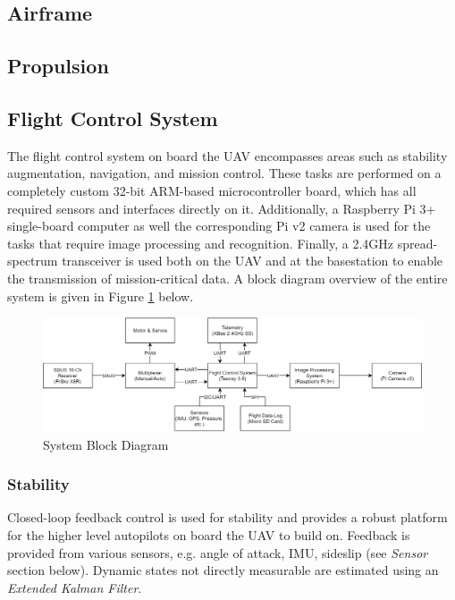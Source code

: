 \subsection{Airframe}

\subsection{Propulsion}

\subsection{Flight Control System}
The flight control system on board the UAV encompasses areas such as stability augmentation, navigation, and mission control. These tasks are performed on a completely custom 32-bit ARM-based microcontroller board, which has all required sensors and interfaces directly on it. Additionally, a Raspberry Pi 3+ single-board computer as well the corresponding Pi v2 camera is used for the tasks that require image processing and recognition. Finally, a 2.4GHz spread-spectrum transceiver is used both on the UAV and at the basestation to enable the transmission of mission-critical data. A block diagram overview of the entire system is given in Figure \ref{fig:SysBlockDiag} below.

\begin{figure}[H]
\centering
\includegraphics[scale=0.3]{figs/SysBlockDiagram.png}
\caption{System Block Diagram}
\label{fig:SysBlockDiag}
\end{figure}

\subsubsection{Stability}
Closed-loop feedback control is used for stability and provides a robust platform for the higher level autopilots on board the UAV to build on. Feedback is provided from various sensors, e.g. angle of attack, IMU, sideslip (see \textit{Sensor} section below). Dynamic states not directly measurable are estimated using an \textit{Extended Kalman Filter}. \\

